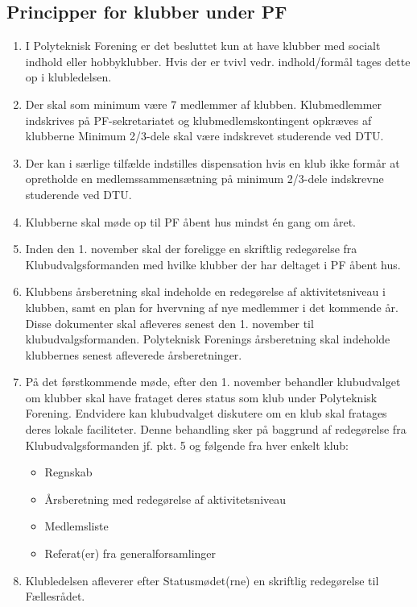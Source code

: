 \subsection{Principper for klubber under PF}
\begin{enumerate}
\item I Polyteknisk Forening er det besluttet kun at have klubber med socialt indhold eller hobbyklubber. Hvis der er tvivl vedr. indhold/formål tages dette op i klubledelsen.
\item Der skal som minimum være 7 medlemmer af klubben. Klubmedlemmer indskrives på PF-sekretariatet og klubmedlemskontingent opkræves af klubberne Minimum 2/3-dele skal være indskrevet studerende ved DTU.
\item Der kan i særlige tilfælde indstilles dispensation hvis en klub ikke formår at opretholde en medlemssammensætning på minimum 2/3-dele indskrevne studerende ved DTU.
\item Klubberne skal møde op til PF åbent hus mindst én gang om året.
\item Inden den 1. november skal der foreligge en skriftlig redegørelse fra Klubudvalgsformanden med hvilke klubber der har deltaget i PF åbent hus.
\item Klubbens årsberetning skal indeholde en redegørelse af aktivitetsniveau i klubben, samt en plan for hvervning af nye medlemmer i det kommende år. Disse dokumenter skal afleveres senest den 1. november til klubudvalgsformanden. Polyteknisk Forenings årsberetning skal indeholde klubbernes senest afleverede årsberetninger.
\item På det førstkommende møde, efter den 1. november behandler klubudvalget om klubber skal have frataget deres status som klub under Polyteknisk Forening. Endvidere kan klubudvalget diskutere om en klub skal fratages deres lokale faciliteter. Denne behandling sker på baggrund af redegørelse fra Klubudvalgsformanden jf. pkt. 5 og følgende fra hver enkelt klub:
\begin{itemize}
\item Regnskab
\item Årsberetning med redegørelse af aktivitetsniveau
\item Medlemsliste
\item Referat(er) fra generalforsamlinger
\end{itemize}
\item Klubledelsen afleverer efter Statusmødet(rne) en skriftlig redegørelse til Fællesrådet.
\end{enumerate}

